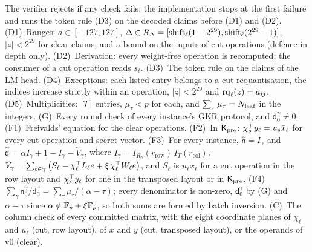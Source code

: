  The verifier rejects if any check fails; the implementation stops at the first
failure and runs the token rule (D3) on the decoded claims before (D1) and (D2).
(D1)~Ranges: $a \in [-127, 127]$, $\Delta \in R_\Delta = [\mathrm{shift}_\ell(1 - 2^{29}),
\mathrm{shift}_\ell(2^{29} - 1)]$, $|z| < 2^{29}$ for clear claims, and a bound on the inputs of cut
operations (defence in depth only).
(D2)~Derivation: every weight-free operation is recomputed; the consumer of a cut operation
reads $s_\ell$.
(D3)~The token rule on the claims of the LM head.
(D4)~Exceptions: each listed entry belongs to a cut requantisation, the indices increase strictly
within an operation, $|z| < 2^{29}$ and $\mathrm{rq}_\ell(z) = a_{ij}$.
(D5)~Multiplicities: $|\mathcal{T}|$ entries, $\mu_\tau < p$ for each, and $\sum_\tau \mu_\tau =
N_{\mathrm{leaf}}$ in the integers.
(G)~Every round check of every instance's GKR protocol, and $\mathsf d_0^\gamma \neq 0$.
(F1)~Freivalds' equation for the clear operations.
(F2)~In $\mathsf{K}_{\mathrm{pre}}$: $\chi_s^\top y_\ell = u_s \bar x_\ell$ for every cut operation and secret vector.
(F3)~For every instance, $\hat{\mathsf n} = I_\gamma$ and $\hat{\mathsf d} = \alpha I_\gamma + 1 -
I_\gamma - \tilde V_\gamma$, where $I_\gamma = I_{R_\gamma}(r_{\mathrm{row}})\,
I_T(r_{\mathrm{col}})$, $\tilde V_\gamma = \sum_{\ell \in \gamma} \big(S_\ell - \chi_\ell^\top
L_\ell e + \xi\, \chi_\ell^\top W_\ell e\big)$, and $S_\ell$ is $u_\ell \bar x_\ell$ for a cut
operation in the row layout and $\chi_\ell^\top y_\ell$ for one in the transposed layout or in
$\mathsf{K}_{\mathrm{pre}}$.
(F4)~$\sum_\gamma \mathsf n_0^\gamma / \mathsf d_0^\gamma = \sum_\tau \mu_\tau / (\alpha -
\tau)$; every denominator is non-zero, $\mathsf d_0^\gamma$ by (G) and $\alpha - \tau$ since
$\alpha \notin \mathbb{F}_p + \xi\mathbb{F}_p$, so both sums are formed by batch inversion.
(C)~The column check of every committed matrix, with the eight coordinate planes of $\chi_\ell$
and $u_\ell$ (cut, row layout), of $\bar x$ and $y$ (cut, transposed layout), or the operands of
v0 (clear).

